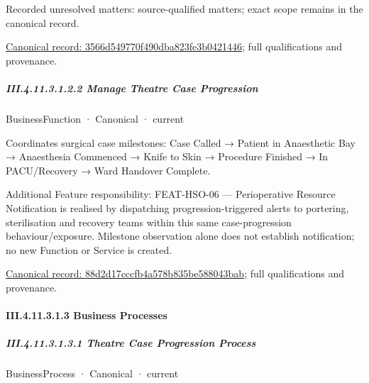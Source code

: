 {\small Recorded unresolved matters: source-qualified matters; exact scope remains in the canonical record.}\par
{\footnotesize \href{../../../../continuum/business/business-function/3566d549770f490dba823fe3b0421446.md}{Canonical record: 3566d549770f490dba823fe3b0421446}; full qualifications and provenance.}\par
\subparagraph*{III.4.11.3.1.2.2 Manage Theatre Case Progression}
\label{navigation:III.4.11.3.1.2.2}

\label{element:88d2d17cccfb4a578b835be588043bab}
{\small BusinessFunction · Canonical · current}\par

Coordinates surgical case milestones: Case Called → Patient in Anaesthetic Bay → Anaesthesia Commenced → Knife to Skin → Procedure Finished → In PACU/Recovery → Ward Handover Complete.



Additional Feature responsibility: FEAT-HSO-06 — Perioperative Resource Notification is realised by dispatching progression-triggered alerts to portering, sterilisation and recovery teams within this same case-progression behaviour/exposure. Milestone observation alone does not establish notification; no new Function or Service is created.


{\footnotesize \href{../../../../continuum/business/business-function/88d2d17cccfb4a578b835be588043bab.md}{Canonical record: 88d2d17cccfb4a578b835be588043bab}; full qualifications and provenance.}\par
\paragraph*{III.4.11.3.1.3 Business Processes}
\label{navigation:III.4.11.3.1.3}

\subparagraph*{III.4.11.3.1.3.1 Theatre Case Progression Process}
\label{navigation:III.4.11.3.1.3.1}

\label{element:8ad97120b5b54a31a64a4522e6bc9fd1}
{\small BusinessProcess · Canonical · current}\par

